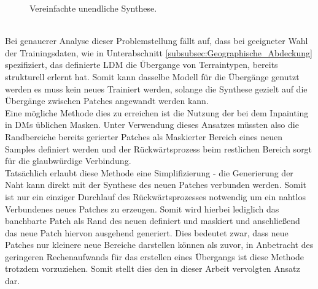 \begin{figure}[htbp]
    \centering
    \caption{Vereinfachte unendliche Synthese.}
    \label{fig:inf_smart}
\end{figure} \\
Bei genauerer Analyse dieser Problemstellung fällt auf, dass bei geeigneter Wahl der Trainingsdaten, wie in Unterabschnitt \ref{subsubsec:Geographische_Abdeckung} spezifiziert, das definierte \ac{LDM} die Übergange von Terraintypen, bereits strukturell erlernt hat. Somit kann dasselbe Modell für die Übergänge genutzt werden es muss kein neues Trainiert werden, solange die Synthese gezielt auf die Übergänge zwischen Patches angewandt werden kann. \\
Eine mögliche Methode dies zu erreichen ist die Nutzung der bei dem Inpainting in \ac{DM}s üblichen Masken. Unter Verwendung dieses Ansatzes müssten also die Randbereiche bereits gerierter Patches als Maskierter Bereich eines neuen Samples definiert werden und der Rückwärtsprozess beim restlichen Bereich sorgt für die glaubwürdige Verbindung. \\ 
Tatsächlich erlaubt diese Methode eine Simplifizierung - die Generierung der Naht kann direkt mit der Synthese des neuen Patches verbunden werden. Somit ist nur ein einziger Durchlauf des Rückwärtsprozesses notwendig um ein nahtlos Verbundenes neues Patches zu erzeugen. Somit wird hierbei lediglich das banchbarte Patch als Rand des neuen definiert und maskiert und anschließend das neue Patch hiervon ausgehend generiert. Dies bedeutet zwar, dass neue Patches nur kleinere neue Bereiche darstellen können als zuvor, in Anbetracht des geringeren Rechenaufwands für das erstellen eines Übergangs ist diese Methode trotzdem vorzuziehen. Somit stellt dies den in dieser Arbeit vervolgten Ansatz dar.

